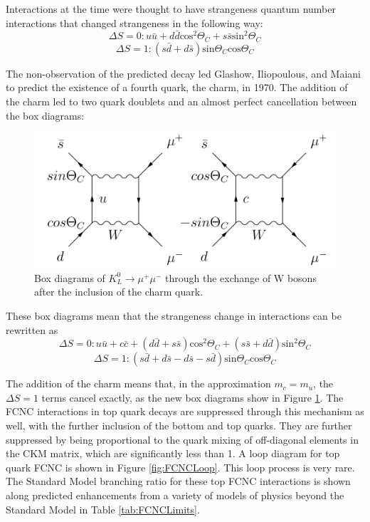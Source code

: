 Interactions at the time were thought to have strangeness quantum number interactions that changed strangeness in the following way:
\[ \Delta S=0 : u\bar{u} +d\bar{d}\text{cos}^2\Theta_C + s\bar{s} \text{sin}^2\Theta_C \]\[
\Delta S =1: (s\bar{d} + d\bar{s})\text{sin}\Theta_C \text{cos}\Theta_C  \]

The non-observation of the predicted decay led Glashow, Iliopoulous, and Maiani to predict the existence of a fourth quark, the charm, in 1970\cite{GIM}.  The addition of the charm led to two quark doublets and an almost perfect cancellation between the box diagrams:

\begin{figure}[h!]
	\centering
	\includegraphics[width=.9\columnwidth]{../ThesisImages/Theory/GIMDiagrams.png}
	\caption{Box diagrams of $K_L^0 \rightarrow \mu^+ \mu^-$ through the exchange of W bosons after the inclusion of the charm quark.}
	\label{fig:KaonBox2}
\end{figure}

These box diagrams mean that the strangeness change in interactions can be rewritten as 
\[ \Delta S=0 : u\bar{u} + c\bar{c} +(d\bar{d}+s\bar{s})\text{cos}^2\Theta_C + (s\bar{s}+d\bar{d}) \text{sin}^2\Theta_C \]\[
\Delta S =1: (s\bar{d} + d\bar{s} -d\bar{s}-s\bar{d})\text{sin}\Theta_C \text{cos}\Theta_C  \]

The addition of the charm means that, in the approximation $m_c = m_u$, the $\Delta S =1$ terms cancel exactly, as the new box diagrams show in Figure \ref{fig:KaonBox2}.  The FCNC interactions in top quark decays are suppressed through this mechanism as well, with the further inclusion of the bottom and top quarks.  They are further suppressed by being proportional to the quark mixing of off-diagonal elements in the CKM matrix, which are significantly less than 1.  A loop diagram for top quark FCNC is shown in Figure \ref{fig:FCNCLoop}.  This loop process is very rare.  The Standard Model branching ratio for these top FCNC interactions is shown along predicted enhancements from a variety of models of physics beyond the Standard Model in Table \ref{tab:FCNCLimits}.

